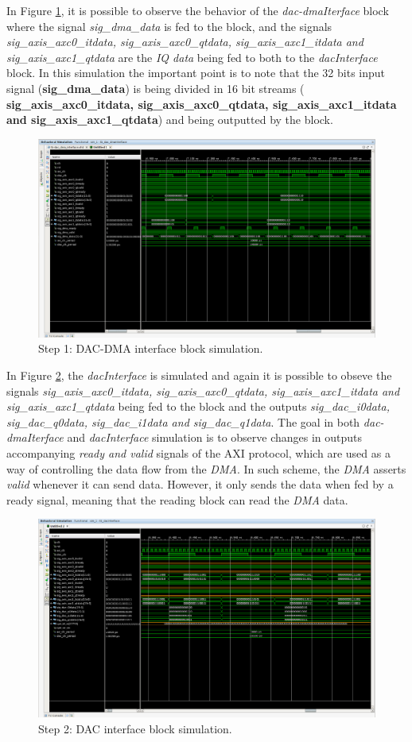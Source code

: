 In Figure \ref{fig:simdacdma}, it is possible to observe the behavior of the
\textit{dac-dmaIterface} block where the signal \textit{sig\_dma\_data} is fed
to the block, and the signals \textit{ sig\_axis\_axc0\_itdata,
sig\_axis\_axc0\_qtdata, sig\_axis\_axc1\_itdata and sig\_axis\_axc1\_qtdata}
are the \textit{IQ data} being fed to both to the \textit{dacInterface} block.
In this simulation the important point is to note that the 32 bits input signal
(\textbf{sig\_dma\_data}) is being divided in 16 bit streams (\textbf{
sig\_axis\_axc0\_itdata, sig\_axis\_axc0\_qtdata, sig\_axis\_axc1\_itdata and
sig\_axis\_axc1\_qtdata}) and being outputted by the block.

\begin{figure}[htbp]
    \centering
    \includegraphics[height=.3\textwidth, width=.85\textwidth,
    trim={{.13\textwidth} {.90\textwidth} {.05\textwidth} {.15\textwidth}},
    clip]{./figures/dac_dmaInterface}
    \caption{ Step 1: DAC-DMA interface block simulation.
    \label{fig:simdacdma}}
\end{figure}

 In Figure \ref{fig:simdac}, the \textit{dacInterface} is simulated and again it
 is possible to obseve the signals \textit{sig\_axis\_axc0\_itdata,
 sig\_axis\_axc0\_qtdata, sig\_axis\_axc1\_itdata and sig\_axis\_axc1\_qtdata}
 being fed to the block and the outputs \textit{sig\_dac\_i0data,
 sig\_dac\_q0data, sig\_dac\_i1data and sig\_dac\_q1data}. The goal in both
 \textit{dac-dmaIterface} and \textit{dacInterface} simulation is to observe
 changes in outputs accompanying \textit{ready and valid} signals of the AXI
 protocol, which are used as a way of controlling the data flow from the
 \textit{DMA}. In such scheme, the \textit{DMA} asserts \textit{valid} whenever
 it can send data. However, it only sends the data when fed by a ready signal,
 meaning that the reading block can read the \textit{DMA} data.

\begin{figure}[htbp]
    \centering
    \includegraphics[height=.4\textwidth, width=1\textwidth,
    trim={{.13\textwidth} {.8\textwidth} {.05\textwidth} {.15\textwidth}},
    clip]{./figures/dacInterface}
    \caption{ Step 2: DAC interface block simulation.
    \label{fig:simdac}}
\end{figure}

